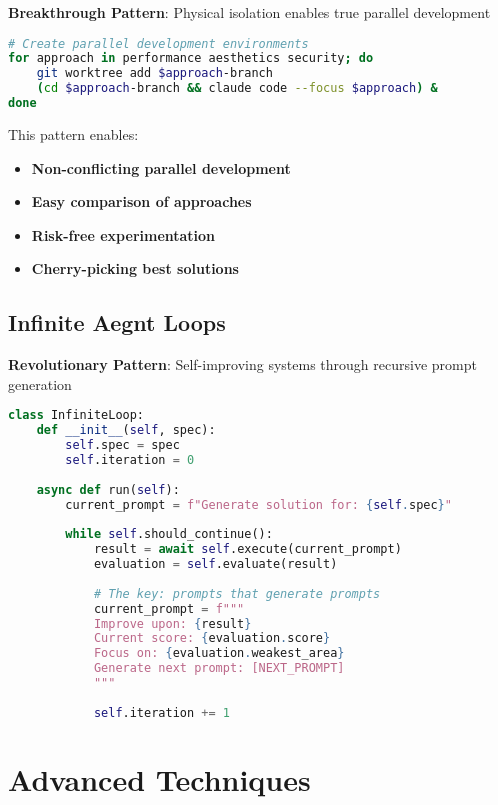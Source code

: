 \documentclass[11pt]{article}
\begin{document}
\textbf{Breakthrough Pattern}: Physical isolation enables true parallel development

\begin{lstlisting}[language=bash]
# Create parallel development environments
for approach in performance aesthetics security; do
    git worktree add $approach-branch
    (cd $approach-branch && claude code --focus $approach) &
done
\end{lstlisting}

This pattern enables:
\begin{itemize}[noitemsep]
\item \textbf{Non-conflicting parallel development}
\item \textbf{Easy comparison of approaches}
\item \textbf{Risk-free experimentation}
\item \textbf{Cherry-picking best solutions}
\end{itemize}

\subsection{Infinite Aegnt Loops}

\textbf{Revolutionary Pattern}: Self-improving systems through recursive prompt generation

\begin{lstlisting}[language=Python]
class InfiniteLoop:
    def __init__(self, spec):
        self.spec = spec
        self.iteration = 0
        
    async def run(self):
        current_prompt = f"Generate solution for: {self.spec}"
        
        while self.should_continue():
            result = await self.execute(current_prompt)
            evaluation = self.evaluate(result)
            
            # The key: prompts that generate prompts
            current_prompt = f"""
            Improve upon: {result}
            Current score: {evaluation.score}
            Focus on: {evaluation.weakest_area}
            Generate next prompt: [NEXT_PROMPT]
            """
            
            self.iteration += 1
\end{lstlisting}

\section{Advanced Techniques}
\end{document}

